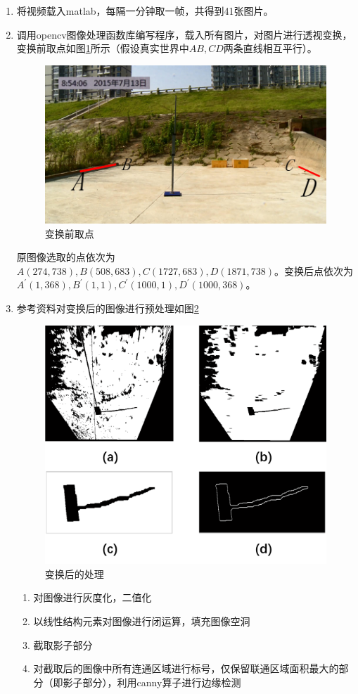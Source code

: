 \documentclass[12pt]{cumcmart}   %
\begin{document}
\begin{enumerate}
	\item 将视频载入matlab，每隔一分钟取一帧，共得到41张图片。
	\item 调用opencv图像处理函数库编写程序，载入所有图片，对图片进行透视变换，变换前取点如图\ref{toushi}所示（假设真实世界中$AB,CD$两条直线相互平行）。
	 \begin{figure}[H]
		\centering
		\includegraphics[scale=0.4]{images/toushi.png}
		\caption{变换前取点}
		\label{toushi}
	\end{figure}   
	原图像选取的点依次为$A(274,738),B(508,683),C(1727,683),D(1871,738)$。变换后点依次为$A^{'}(1,368),B^{'}(1,1),C^{'}(1000,1),D^{'}(1000,368)$。
	
	\item 参考资料对变换后的图像进行预处理如图\ref{chuli}
	 \begin{figure}[H]
		\centering
		\includegraphics[scale=0.4]{images/chuli.png}
		\caption{变换后的处理}
		\label{chuli}
	\end{figure} 
   \begin{enumerate}
   	\item 对图像进行灰度化，二值化
   	\item 以线性结构元素对图像进行闭运算，填充图像空洞
   	\item 截取影子部分
   	\item 对截取后的图像中所有连通区域进行标号，仅保留联通区域面积最大的部分（即影子部分），利用canny算子进行边缘检测
   \end{enumerate}


\end{enumerate}
\end{document}

